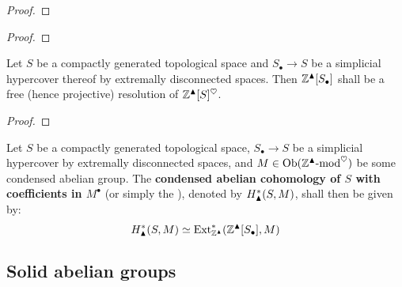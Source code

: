             \begin{lemma} \label{lemma: simplical_hypercovers_of_compacta_by_extremally_disconnected_spaces}
                
            \end{lemma}
                \begin{proof}
                    
                \end{proof}
            \begin{lemma}
                
            \end{lemma}
                \begin{proof}
                    
                \end{proof}
            \begin{proposition} \label{prop: free_resolutions_of_condensed_abelian_groups}
                Let $S$ be a compactly generated topological space and $S_{\bullet} \to S$ be a simplicial hypercover thereof by extremally disconnected spaces. Then $\mathbb{Z}^{\blacktriangle}[S_{\bullet}]$ shall be a free (hence projective) resolution of $\mathbb{Z}^{\blacktriangle}[S]^{\heartsuit}$.
            \end{proposition}
                \begin{proof}
                            
                \end{proof}
            \begin{definition} \label{def: condensed_abelian_sheaf_cohomology}
                Let $S$ be a compactly generated topological space, $S_{\bullet} \to S$ be a simplicial hypercover by extremally disconnected spaces, and $M \in \mathrm{Ob}(\mathbb{Z}^{\blacktriangle}\text{-}\mathrm{mod}^{\heartsuit})$ be some condensed abelian group. The \textbf{condensed abelian cohomology of $S$ with coefficients in $M^{\bullet}$} (or simply the ), denoted by $H^*_{\blacktriangle}(S, M)$, shall then be given by:
                    $$H^*_{\blacktriangle}(S, M) \simeq \mathrm{Ext}^*_{\mathbb{Z}^{\blacktriangle}}(\mathbb{Z}^{\blacktriangle}[S_{\bullet}], M)$$
            \end{definition}
        
    \subsection{Solid abelian groups}
